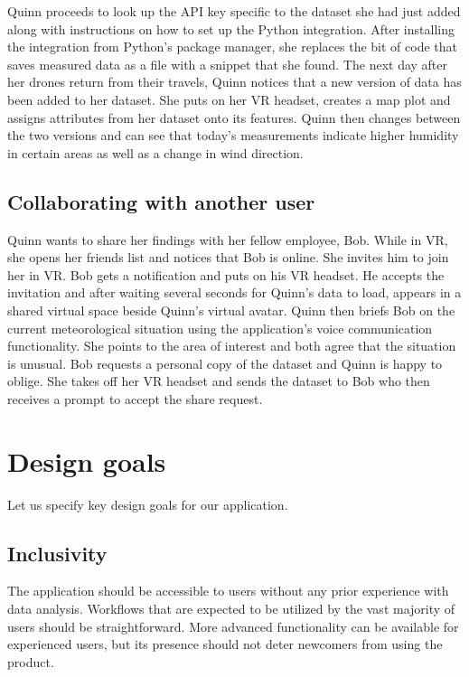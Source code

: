 \documentclass[thesis=M,english,hidelinks]{FITthesisXE}[2012/06/26]
\begin{document}
Quinn proceeds to look up the API key specific to the dataset she had just added along with instructions on how to set up the Python integration. After installing the integration from Python's package manager, she replaces the bit of code that saves measured data as a file with a snippet that she found. The next day after her drones return from their travels, Quinn notices that a new version of data has been added to her dataset. She puts on her VR headset, creates a map plot and assigns attributes from her dataset onto its features. Quinn then changes between the two versions and can see that today's measurements indicate higher humidity in certain areas as well as a change in wind direction.

\subsection{Collaborating with another user}

Quinn wants to share her findings with her fellow employee, Bob. While in VR, she opens her friends list and notices that Bob is online. She invites him to join her in VR. Bob gets a notification and puts on his VR headset. He accepts the invitation and after waiting several seconds for Quinn's data to load, appears in a shared virtual space beside Quinn's virtual avatar. Quinn then briefs Bob on the current meteorological situation using the application's voice communication functionality. She points to the area of interest and both agree that the situation is unusual. Bob requests a personal copy of the dataset and Quinn is happy to oblige. She takes off her VR headset and sends the dataset to Bob who then receives a prompt to accept the share request.

\section{Design goals}

Let us specify key design goals for our application.

\subsection{Inclusivity}

The application should be accessible to users without any prior experience with data analysis. Workflows that are expected to be utilized by the vast majority of users should be straightforward. More advanced functionality can be available for experienced users, but its presence should not deter newcomers from using the product.
\end{document}
